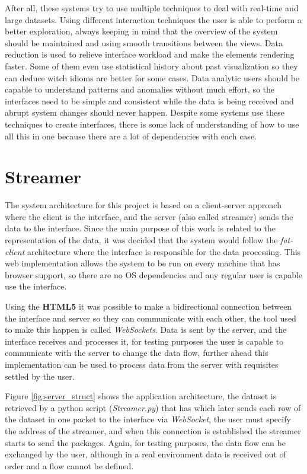 \documentclass[letterpaper, 10 pt, conference]{ieeeconf}  %
\begin{document}
After all, these systems try to use multiple techniques to deal with real-time and large datasets. Using different interaction techniques the user is able to perform a better exploration, always keeping in mind that the overview of the system should be maintained and using smooth transitions between the views. Data reduction is used to relieve interface workload and make the elements rendering faster. Some of them even use statistical history about past visualization so they can deduce witch idioms are better for some cases. Data analytic users should be capable to understand patterns and anomalies without much effort, so the interfaces need to be simple and consistent while the data is being received and abrupt system changes should never happen. Despite some systems use these techniques to create interfaces, there is some lack of understanding of how to use all this in one because there are a lot of dependencies with each case.



\section{Streamer}
\label{section:streammer}

The system architecture for this project is based on a client-server approach where the client is the interface, and the server (also called streamer) sends the data to the interface. Since the main purpose of this work is related to the representation of the data, it was decided that the system would follow the \textit{fat-client} architecture where the interface is responsible for the data processing. This web implementation allows the system to be run on every machine that has browser support, so there are no OS dependencies and any regular user is capable use the interface.

Using the \textbf{HTML5} it was possible to make a bidirectional connection between the interface and server so they can communicate with each other, the tool used to make this happen is called \textit{WebSockets}. Data is sent by the server, and the interface receives and processes it, for testing purposes the user is capable to communicate with the server to change the data flow, further ahead this implementation can be used to process data from the server with requisites settled by the user.

Figure \ref{fig:server_struct} shows the application architecture, the dataset is retrieved by a python script (\textit{Streamer.py}) that has which later sends each row of the dataset in one packet to the interface via \textit{WebSocket}, the user must specify the address of the streamer, and when this connection is established the streamer starts to send the packages. Again, for testing purposes, the data flow can be exchanged by the user, although in a real environment data is received out of order and a flow cannot be defined.
\end{document}
